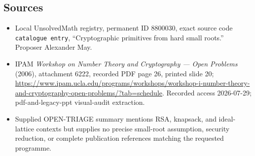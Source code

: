 \documentclass[11pt]{article}
\begin{document}
\subsection{Sources}
\begin{itemize}
\item Local UnsolvedMath registry, permanent ID \(8800030\), exact source code \texttt{catalogue entry}, ``Cryptographic primitives from hard small roots.'' Proposer Alexander May.
\item IPAM \emph{Workshop on Number Theory and Cryptography --- Open Problems} (2006), attachment 6222, recorded PDF page 26, printed slide 20; \url{https://www.ipam.ucla.edu/programs/workshops/workshop-i-number-theory-and-cryptography-open-problems/?tab=schedule}. Recorded access 2026-07-29; pdf-and-legacy-ppt visual-audit extraction.
\item Supplied OPEN-TRIAGE summary mentions RSA, knapsack, and ideal-lattice contexts but supplies no precise small-root assumption, security reduction, or complete publication references matching the requested programme.
\end{itemize}
\end{document}
